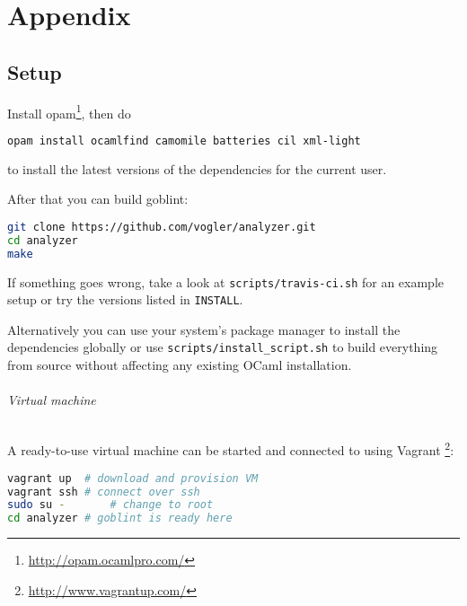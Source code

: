 \part*{Appendix}
\label{appendix}

\appendix %


\chapter{Setup}
\label{chap:app:setup}
Install opam\footnote{\url{http://opam.ocamlpro.com/}}, then do
\begin{lstlisting}[language=Bash]
opam install ocamlfind camomile batteries cil xml-light
\end{lstlisting}
to install the latest versions of the dependencies for the current user.

After that you can build goblint:

\begin{lstlisting}[language=Bash]
git clone https://github.com/vogler/analyzer.git
cd analyzer
make
\end{lstlisting}
If something goes wrong, take a look at \verb|scripts/travis-ci.sh| for an example setup or try the versions listed in \verb|INSTALL|.

Alternatively you can use your system's package manager to install the dependencies globally or use \verb|scripts/install_script.sh| to build everything from source without affecting any existing OCaml installation.


\paragraph*{Virtual machine}
A ready-to-use virtual machine can be started and connected to using Vagrant \footnote{\url{http://www.vagrantup.com/}}:
\begin{lstlisting}[language=Bash]
vagrant up	# download and provision VM
vagrant ssh	# connect over ssh
sudo su -		# change to root
cd analyzer	# goblint is ready here
\end{lstlisting}


